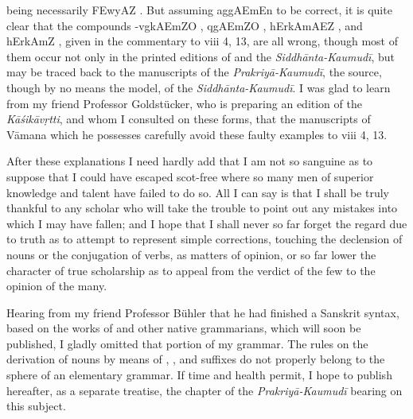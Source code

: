 being necessarily {\dn \3FEwyAZ} . But assuming {\dn ag\5gAEmEn}
 to be correct, it is quite clear that the compounds
{\dn -vg\0kAEmZO} , {\dn {}qgAEmZO}
, {\dn hErkAmAEZ} , and {\dn hErkAm\?Z}
, given in the commentary to viii 4, 13, are all wrong,
though most of them occur not only in the printed editions of \panini{}
and the \emph{Siddhānta-Kaumudī}, but may be traced back to the
manuscripts of the \emph{Prakriyā-Kaumudī}, the source, though by no
means the model, of the \emph{Siddhānta-Kaumudī}. I was glad to learn
from my friend Professor Goldstücker, who is preparing an edition of the
\emph{Kāśikāvṛtti}, and whom I consulted on these forms, that the
manuscripts of Vāmana which he possesses carefully avoid these faulty
examples to \panini{} viii 4, 13.

After these explanations I need hardly add that I am not so sanguine as
to suppose that I could have escaped scot-free where so many men of
superior knowledge and talent have failed to do so. All I can say is
that I shall be truly thankful to any scholar who will take the trouble
to point out any mistakes into which I may have fallen; and I hope that
I shall never so far forget the regard due to truth as to attempt to
represent simple corrections, touching the declension of nouns or the
conjugation of verbs, as matters of opinion, or so far lower the
character of true scholarship as to appeal from the verdict of the few
to the opinion of the many.

Hearing from my friend Professor Bühler that he had finished a Sanskrit
syntax, based on the works of \panini{} and other native grammarians,
which will soon be published, I gladly omitted that portion of my
grammar. The rules on the derivation of nouns by means of ,
, and  suffixes do not properly belong to the
sphere of an elementary grammar. If time and health permit, I hope to
publish hereafter, as a separate treatise, the chapter of the
\emph{Prakriyā-Kaumudī} bearing on this subject.

